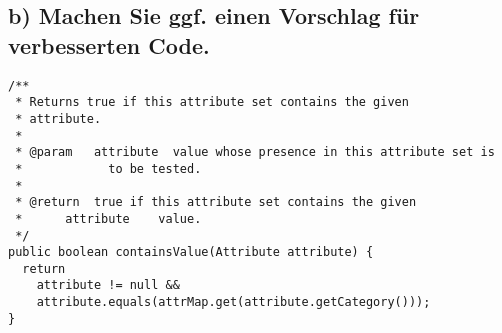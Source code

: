 \documentclass[a4paper,10pt]{article}
\begin{document}
\subsection*{b) Machen Sie ggf. einen Vorschlag für verbesserten Code.}
\begin{lstlisting}[caption={Vorschlag für Methode \textit{containsValue}},label=lst:ChangedContainsValue]
/**
 * Returns true if this attribute set contains the given
 * attribute.
 *
 * @param	attribute  value whose presence in this attribute set is
 *            to be tested.
 *
 * @return	true if this attribute set contains the given
 *      attribute    value.
 */
public boolean containsValue(Attribute attribute) {
  return
    attribute != null &&
    attribute.equals(attrMap.get(attribute.getCategory()));
}
\end{lstlisting}
\end{document}
